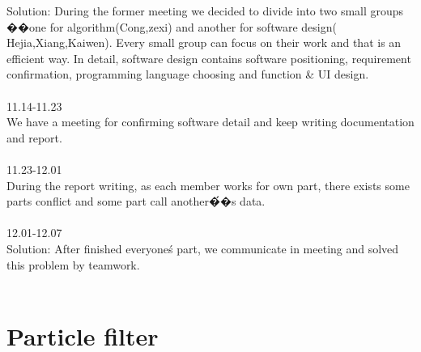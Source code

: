 \documentclass[11pt,oneside,a4paper]{article}
\begin{document}
Solution: During the former meeting we decided to divide into two small groups ��one for algorithm(Cong,zexi) and another for software design( Hejia,Xiang,Kaiwen). Every small group can focus on their work and that is an efficient way. In detail, software design contains software positioning, requirement confirmation, programming language choosing and function & UI design.
\\\\
11.14-11.23\\
We have a meeting for confirming software detail and keep writing documentation and report.
\\\\
11.23-12.01\\
During the report writing, as each member works for own part, there exists some parts conflict and some part call another\'��s data.
\\\\
12.01-12.07\\
Solution: After finished everyone\'s part, we communicate in meeting and solved this problem by teamwork.
\\\\
\section{Particle filter}\\
\end{document}
